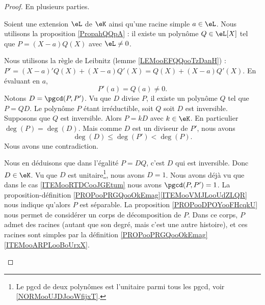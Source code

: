 \begin{proof}
	En plusieurs parties.
	\begin{subproof}
		Soient une extension \( \eL\) de \( \eK\) ainsi qu'une racine simple \( a\in \eL\). Nous utilisons la proposition \ref{PropahQQpA} : il existe un polynôme \( Q\in \eL[X]\) tel que \( P=(X-a)Q(X)\) avec \( \eL\neq 0\).

		Nous utilisons la règle de Leibnitz (lemme \ref{LEMooEFQQooTzDanH}) : \( P'=(X-a)'Q(X)+(X-a)Q'(X)=Q(X)+(X-a)Q'(X)\). En évaluant en \( a\),
		\begin{equation}
			P'(a)=Q(a)\neq 0.
		\end{equation}
		\spitem[\ref{ITEMooRTDCooJGEtum} implique \( \pgcd(P,P')=1\)]
		Notons \( D=\pgcd(P,P')\). Vu que \( D\) divise \( P\), il existe un polynôme \( Q\) tel que \( P=QD\). Le polynôme \( P\) étant irréductible, soit \( Q\) soit \( D\) est inversible. Supposons que \( Q\) est inversible. Alors \( P=kD\) avec \( k\in \eK\). En particulier \( \deg(P)=\deg(D)\). Mais comme \( D\) est un diviseur de \( P'\), nous avons
		\begin{equation}
			\deg(D)\leq \deg(P')<\deg(P).
		\end{equation}
		Nous avons une contradiction.

		Nous en déduisons que dans l'égalité \( P=DQ\), c'est \( D\) qui est inversible. Donc \( D\in \eK\). Vu que \( D\) est unitaire\footnote{Le pgcd de deux polynômes est l'unitaire parmi tous les pgcd, voir \ref{NORMooUJDJooWfijxT}.}, nous avons \( D=1\).
		Nous avons déjà vu que dans le cas \ref{ITEMooRTDCooJGEtum} nous avons \( \pgcd(P,P')=1\). La proposition-définition \ref{PROPooPRGQooOkEmag}\ref{ITEMooVMJLooUdZLQR} nous indique qu'alors \( P\) est séparable.
		La proposition \ref{PROPooDPOYooFHcqkU} nous permet de considérer un corps de décomposition de \( P\). Dans ce corps, \( P\) admet des racines (autant que son degré, mais c'est une autre histoire), et ces racines sont simples par la définition \ref{PROPooPRGQooOkEmag}\ref{ITEMooARPLooBoUrxX}.
	\end{subproof}
\end{proof}


